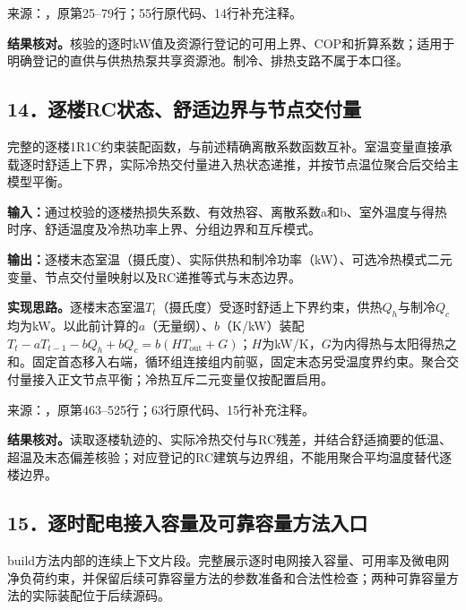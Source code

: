 {\small 来源：，原第25--79行；55行原代码、14行补充注释。}\par

\begingroup
{}

\endgroup

\noindent\textbf{结果核对。}核验的逐时kW值及资源行登记的可用上界、COP和折算系数；适用于明确登记的直供与供热热泵共享资源池。制冷、排热支路不属于本口径。

\subsection*{14．逐楼RC状态、舒适边界与节点交付量}
完整的逐楼1R1C约束装配函数，与前述精确离散系数函数互补。室温变量直接承载逐时舒适上下界，实际冷热交付量进入热状态递推，并按节点温位聚合后交给主模型平衡。

\noindent\textbf{输入：}通过校验的逐楼热损失系数、有效热容、离散系数a和b、室外温度与得热时序、舒适温度及冷热功率上界、分组边界和互斥模式。\par
\noindent\textbf{输出：}逐楼末态室温（摄氏度）、实际供热和制冷功率（kW）、可选冷热模式二元变量、节点交付量映射以及RC递推等式与末态边界。\par

\noindent\textbf{实现思路。}逐楼末态室温$T_t$（摄氏度）受逐时舒适上下界约束，供热$Q_h$与制冷$Q_c$均为kW。以此前计算的$a$（无量纲）、$b$（K/kW）装配$T_t-aT_{t-1}-bQ_h+bQ_c=b(HT_{\mathrm{out}}+G)$；$H$为kW/K，$G$为内得热与太阳得热之和。固定首态移入右端，循环组连接组内前驱，固定末态另受温度界约束。聚合交付量接入正文节点平衡；冷热互斥二元变量仅按配置启用。

{\small 来源：，原第463--525行；63行原代码、15行补充注释。}\par

\begingroup
{}

\endgroup

\noindent\textbf{结果核对。}读取逐楼轨迹的、实际冷热交付与RC残差，并结合舒适摘要的低温、超温及末态偏差核验；对应登记的RC建筑与边界组，不能用聚合平均温度替代逐楼边界。

\subsection*{15．逐时配电接入容量及可靠容量方法入口}
build方法内部的连续上下文片段。完整展示逐时电网接入容量、可用率及微电网净负荷约束，并保留后续可靠容量方法的参数准备和合法性检查；两种可靠容量方法的实际装配位于后续源码。

